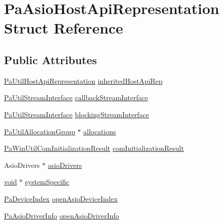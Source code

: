 \hypertarget{struct_pa_asio_host_api_representation}{}\section{Pa\+Asio\+Host\+Api\+Representation Struct Reference}
\label{struct_pa_asio_host_api_representation}
\subsection*{Public Attributes}
\begin{DoxyCompactItemize}
\item 
\hyperlink{struct_pa_util_host_api_representation}{Pa\+Util\+Host\+Api\+Representation} \hyperlink{struct_pa_asio_host_api_representation_a2ecf707b238a398f2ca72e6febd76ac4}{inherited\+Host\+Api\+Rep}
\item 
\hyperlink{struct_pa_util_stream_interface}{Pa\+Util\+Stream\+Interface} \hyperlink{struct_pa_asio_host_api_representation_ad334a256057152e82f5da421ef0759c2}{callback\+Stream\+Interface}
\item 
\hyperlink{struct_pa_util_stream_interface}{Pa\+Util\+Stream\+Interface} \hyperlink{struct_pa_asio_host_api_representation_a8cf5e8d03dcc4fc3406c2d3b9d31a4a1}{blocking\+Stream\+Interface}
\item 
\hyperlink{struct_pa_util_allocation_group}{Pa\+Util\+Allocation\+Group} $\ast$ \hyperlink{struct_pa_asio_host_api_representation_aabbb5dbd06d01332baa1d175de3397ed}{allocations}
\item 
\hyperlink{struct_pa_win_util_com_initialization_result}{Pa\+Win\+Util\+Com\+Initialization\+Result} \hyperlink{struct_pa_asio_host_api_representation_a7d635d5f68a068d72ef4949bbadc3c1e}{com\+Initialization\+Result}
\item 
Asio\+Drivers $\ast$ \hyperlink{struct_pa_asio_host_api_representation_acca033c1828e51de166838ef7ce97936}{asio\+Drivers}
\item 
\hyperlink{sound_8c_ae35f5844602719cf66324f4de2a658b3}{void} $\ast$ \hyperlink{struct_pa_asio_host_api_representation_aff14b5ae683f1490006752d81e3d3981}{system\+Specific}
\item 
\hyperlink{portaudio_8h_ad79317e65bde63d76c4b8e711ac5a361}{Pa\+Device\+Index} \hyperlink{struct_pa_asio_host_api_representation_a7c0a166188935ebcfb04a328082db441}{open\+Asio\+Device\+Index}
\item 
\hyperlink{struct_pa_asio_driver_info}{Pa\+Asio\+Driver\+Info} \hyperlink{struct_pa_asio_host_api_representation_a8e40fc856a3e71915b1d5c3dbe901b52}{open\+Asio\+Driver\+Info}
\end{DoxyCompactItemize}


